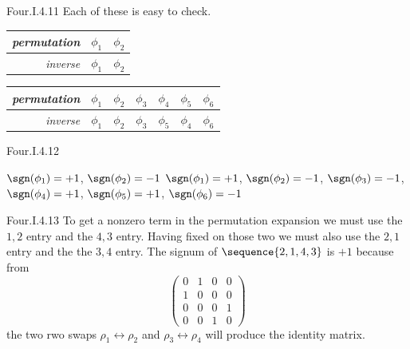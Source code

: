\begin{ans}{Four.I.4.11}
      Each of these is easy to check.
      \begin{exparts*}
        \partsitem
          \begin{tabular}[t]{r|cc}
            \textit{permutation} &$\phi_1$  &$\phi_2$ \\
             \hline
            \textit{inverse}     &$\phi_1$  &$\phi_2$
          \end{tabular}
        \partsitem
          \begin{tabular}[t]{r|cccccc}
            \textit{permutation}
              &$\phi_1$ &$\phi_2$ &$\phi_3$ &$\phi_4$ &$\phi_5$ &$\phi_6$ \\
            \hline
            \textit{inverse}
              &$\phi_1$ &$\phi_2$ &$\phi_3$ &$\phi_5$ &$\phi_4$ &$\phi_6$
          \end{tabular}
      \end{exparts*}
    
\end{ans}
\begin{ans}{Four.I.4.12}
      \begin{exparts}
        \partsitem \( \sgn(\phi_1)=+1 \), \( \sgn(\phi_2)=-1 \)
        \partsitem \( \sgn(\phi_1)=+1 \), \( \sgn(\phi_2)=-1 \),
              \( \sgn(\phi_3)=-1 \), \( \sgn(\phi_4)=+1 \),
              \( \sgn(\phi_5)=+1 \), \( \sgn(\phi_6)=-1 \)
      \end{exparts}
     
\end{ans}
\begin{ans}{Four.I.4.13}
      To get a nonzero term in the permutation expansion we must use
      the \( 1,2 \) entry and the \( 4,3 \) entry.
      Having fixed on those two we must also use the \( 2,1 \) entry and
      the the \( 3,4 \) entry.
      The signum of \( \sequence{2,1,4,3} \) is \( +1 \) because from
      \begin{equation*}
        \begin{pmatrix}
          0  &1  &0  &0  \\
          1  &0  &0  &0  \\
          0  &0  &0  &1  \\
          0  &0  &1  &0
        \end{pmatrix}
      \end{equation*}
      the two rwo swaps $\rho_1\leftrightarrow\rho_2$ and
      $\rho_3\leftrightarrow\rho_4$ will produce the identity matrix.
    
\end{ans}
